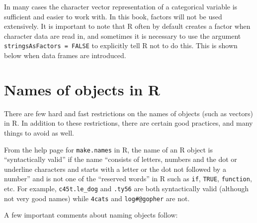 \documentclass[12pt,oneside]{book}\usepackage[]{graphicx}\usepackage[]{color}
\begin{document}
In many cases the character vector representation of a categorical variable is sufficient and easier to work with. In this book, factors will not be used extensively. It is important to note that R often by default creates a factor when character data are read in, and sometimes it is necessary to use the argument \verb+stringsAsFactors = FALSE+ to explicitly tell R not to do this. This is shown below when data frames are introduced.

\section{Names of objects in R}
There are few hard and fast restrictions on the names of objects (such as vectors) in R. In addition to these restrictions, there are certain good practices, and many things to avoid as well. 

From the help page for \verb+make.names+ in R,  the name of an R object is ``syntactically valid'' if the name ``consists of letters, numbers and the dot or underline characters and starts with a letter or the dot not followed by a number'' and is not one of the ``reserved words'' in R such as \verb+if+, \verb+TRUE+, \verb+function+, etc.  For example, \verb+c45t.le_dog+  and \verb+.ty56+ are both syntactically valid (although not very good names) while \verb+4cats+ and \verb+log#@gopher+ are not. 

A few important comments about naming objects follow:
\end{document}
